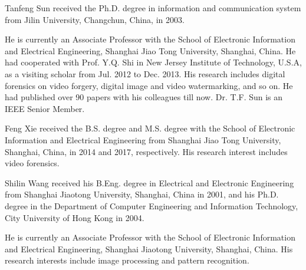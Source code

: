 \documentclass[journal,sort]{IEEEtran}
\begin{document}
\begin{IEEEbiography}{Tanfeng Sun}
	received the Ph.D. degree in information and communication system from Jilin University, Changchun, China, in 2003.
	
	He is currently an Associate Professor with the School of Electronic Information and Electrical Engineering, Shanghai Jiao Tong University, Shanghai, China. He had cooperated with Prof. Y.Q. Shi in New Jersey Institute of Technology, U.S.A, as a visiting scholar from Jul. 2012 to Dec. 2013. His research includes digital forensics on video forgery, digital image and video watermarking, and so on.  He had published over 90 papers with his colleagues till now. Dr. T.F. Sun is an IEEE Senior Member.	
	
\end{IEEEbiography}

\begin{IEEEbiography}{Feng Xie}
	received the B.S. degree and M.S. degree with the School of Electronic Information and Electrical Engineering from Shanghai Jiao Tong University, Shanghai, China, in 2014 and 2017, respectively. His research interest includes video forensics.
	
	
\end{IEEEbiography}

\begin{IEEEbiography}{Shilin Wang}
	received his B.Eng. degree in Electrical and Electronic Engineering from Shanghai Jiaotong University, Shanghai, China in 2001, and his Ph.D. degree in the Department of Computer Engineering and Information Technology, City University of Hong Kong in 2004.
	
	He is currently an Associate Professor with the School of Electronic Information and Electrical Engineering, Shanghai Jiaotong University, Shanghai, China. His research interests include image processing and pattern recognition. 
\end{IEEEbiography}
\end{document}
